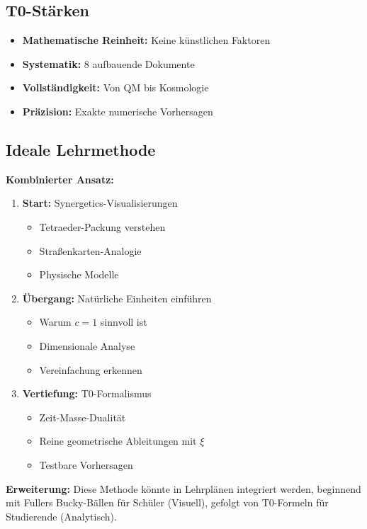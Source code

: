 \documentclass[12pt,a4paper]{article}
\newcommand{\xipar}{\xi}
\begin{document}
	\subsection{T0-Stärken}
	
	\begin{itemize}
		\item \textbf{Mathematische Reinheit:} Keine künstlichen Faktoren
		\item \textbf{Systematik:} 8 aufbauende Dokumente
		\item \textbf{Vollständigkeit:} Von QM bis Kosmologie
		\item \textbf{Präzision:} Exakte numerische Vorhersagen
	\end{itemize}
	
	\subsection{Ideale Lehrmethode}
	
	\begin{gemeinsam}
		\textbf{Kombinierter Ansatz:}
		
		\begin{enumerate}
			\item \textbf{Start:} Synergetics-Visualisierungen
			\begin{itemize}
				\item Tetraeder-Packung verstehen
				\item Straßenkarten-Analogie
				\item Physische Modelle
			\end{itemize}
			
			\item \textbf{Übergang:} Natürliche Einheiten einführen
			\begin{itemize}
				\item Warum $c = 1$ sinnvoll ist
				\item Dimensionale Analyse
				\item Vereinfachung erkennen
			\end{itemize}
			
			\item \textbf{Vertiefung:} T0-Formalismus
			\begin{itemize}
				\item Zeit-Masse-Dualität
				\item Reine geometrische Ableitungen mit $\xipar$
				\item Testbare Vorhersagen
			\end{itemize}
		\end{enumerate}
		
		\textbf{Erweiterung:} Diese Methode könnte in Lehrplänen integriert werden, beginnend mit Fullers Bucky-Bällen für Schüler (Visuell), gefolgt von T0-Formeln für Studierende (Analytisch). 	\end{gemeinsam}
	
\end{document}
